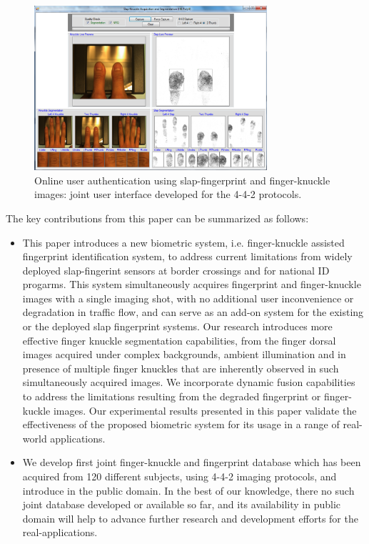 \begin{figure}[!ht]
    \centering
    \includegraphics[width=3.4in]{Figures/system.png}
    \caption{Online user authentication using slap-fingerprint and finger-knuckle images: joint user interface developed for the 4-4-2 protocols.}
    \label{system}
\end{figure}

The key contributions from this paper can be summarized as follows: 

\begin{itemize}
    \item This paper introduces a new biometric system, i.e. finger-knuckle assisted fingerprint identification system, to address current limitations from widely deployed slap-fingerint sensors at border crossings and for national ID progarms. This system simultaneously acquires fingerprint and finger-knuckle images with a single imaging shot, with no additional user inconvenience or degradation in traffic flow, and can serve as an add-on system for the existing or the deployed slap fingerprint systems. Our research introduces more effective finger knuckle segmentation capabilities, from the finger dorsal images acquired under complex backgrounds, ambient illumination and in presence of multiple finger knuckles that are inherently observed in such simultaneously acquired images. We incorporate dynamic fusion capabilities to address the limitations resulting from the degraded fingerprint or finger-kuckle images. Our experimental results presented in this paper validate the effectiveness of the proposed biometric system for its usage in a range of real-world applications. 
    \item We develop first joint finger-knuckle and fingerprint database which has been acquired from 120 different subjects, using 4-4-2 imaging protocols, and introduce in the public domain. In the best of our knowledge, there no such joint database developed or available so far, and its availability in public domain will help to advance further research and development efforts for the real-applications. 
\end{itemize}



